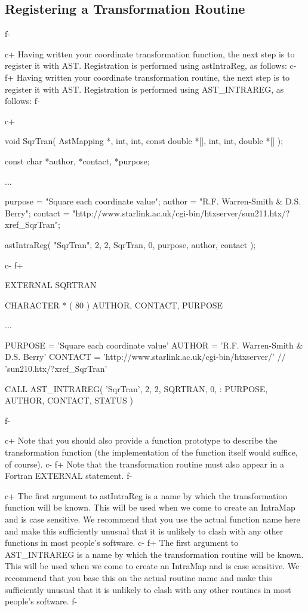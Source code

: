 \documentclass[twoside,11pt]{starlink}
\begin{document}
\subsection{\label{ss:registeringintramaps}Registering a Transformation Routine}
f-

c+
Having written your coordinate transformation function, the next step
is to register it with AST. Registration is performed using
astIntraReg, as follows:
c-
f+
Having written your coordinate transformation routine, the next step
is to register it with AST. Registration is performed using
AST\_INTRAREG, as follows:
f-

c+
\small
\begin{terminalv}
void SqrTran( AstMapping *, int, int, const double *[], int, int, double *[] );

const char *author, *contact, *purpose;

...

purpose = "Square each coordinate value";
author =  "R.F. Warren-Smith & D.S. Berry";
contact = "http://www.starlink.ac.uk/cgi-bin/htxserver/sun211.htx/?xref_SqrTran";

astIntraReg( "SqrTran", 2, 2, SqrTran, 0, purpose, author, contact );
\end{terminalv}
\normalsize
c-
f+
\small
\begin{terminalv}
      EXTERNAL SQRTRAN

      CHARACTER * ( 80 ) AUTHOR, CONTACT, PURPOSE

      ...

      PURPOSE = 'Square each coordinate value'
      AUTHOR  = 'R.F. Warren-Smith & D.S. Berry'
      CONTACT = 'http://www.starlink.ac.uk/cgi-bin/htxserver/' //
                'sun210.htx/?xref_SqrTran'

      CALL AST_INTRAREG( 'SqrTran', 2, 2, SQRTRAN, 0,
     :                   PURPOSE, AUTHOR, CONTACT, STATUS )
\end{terminalv}
\normalsize
f-

c+
Note that you should also provide a function prototype to describe the
transformation function (the implementation of the function itself
would suffice, of course).
c-
f+
Note that the transformation routine must also appear in a Fortran
EXTERNAL statement.
f-

c+
The first argument to astIntraReg is a name by which the
transformation function will be known. This will be used when we come
to create an IntraMap and is case sensitive. We recommend that you use
the actual function name here and make this sufficiently unusual that
it is unlikely to clash with any other functions in most people's
software.
c-
f+
The first argument to AST\_INTRAREG is a name by which the
transformation routine will be known. This will be used when we come
to create an IntraMap and is case sensitive. We recommend that you
base this on the actual routine name and make this sufficiently
unusual that it is unlikely to clash with any other routines in most
people's software.
f-
\end{document}
